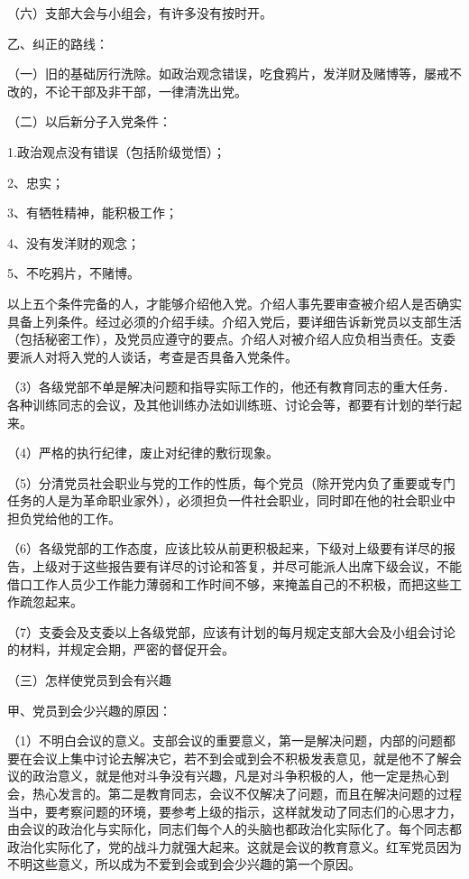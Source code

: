（六）支部大会与小组会，有许多没有按时开。

乙、纠正的路线：

（一）旧的基础厉行洗除。如政治观念错误，吃食鸦片，发洋财及赌博等，屡戒不改的，不论干部及非干部，一律清洗出党。

（二）以后新分子入党条件：

1.政治观点没有错误（包括阶级觉悟）；

2、忠实；

3、有牺牲精神，能积极工作；

4、没有发洋财的观念；

5、不吃鸦片，不赌博。

以上五个条件完备的人，才能够介绍他入党。介绍人事先要审查被介绍人是否确实具备上列条件。经过必须的介绍手续。介绍入党后，要详细告诉新党员以支部生活（包括秘密工作），及党员应遵守的要点。介绍人对被介绍人应负相当责任。支委要派人对将入党的人谈话，考查是否具备入党条件。

（3）各级党部不单是解决问题和指导实际工作的，他还有教育同志的重大任务．各种训练同志的会议，及其他训练办法如训练班、讨论会等，都要有计划的举行起来。

（4）严格的执行纪律，废止对纪律的敷衍现象。

（5）分清党员社会职业与党的工作的性质，每个党员（除开党内负了重要或专门任务的人是为革命职业家外），必须担负一件社会职业，同时即在他的社会职业中担负党给他的工作。

（6）各级党部的工作态度，应该比较从前更积极起来，下级对上级要有详尽的报告，上级对于这些报告要有详尽的讨论和答复，并尽可能派人出席下级会议，不能借口工作人员少工作能力薄弱和工作时间不够，来掩盖自己的不积极，而把这些工作疏忽起来。

（7）支委会及支委以上各级党部，应该有计划的每月规定支部大会及小组会讨论的材料，并规定会期，严密的督促开会。

（三）怎样使党员到会有兴趣

甲、党员到会少兴趣的原因：

（1）不明白会议的意义。支部会议的重要意义，第一是解决问题，内部的问题都要在会议上集中讨论去解决它，若不到会或到会不积极发表意见，就是他不了解会议的政治意义，就是他对斗争没有兴趣，凡是对斗争积极的人，他一定是热心到会，热心发言的。第二是教育同志，会议不仅解决了问题，而且在解决问题的过程当中，要考察问题的环境，要参考上级的指示，这样就发动了同志们的心思才力，由会议的政治化与实际化，同志们每个人的头脑也都政治化实际化了。每个同志都政治化实际化了，党的战斗力就强大起来。这就是会议的教育意义。红军党员因为不明这些意义，所以成为不爱到会或到会少兴趣的第一个原因。

